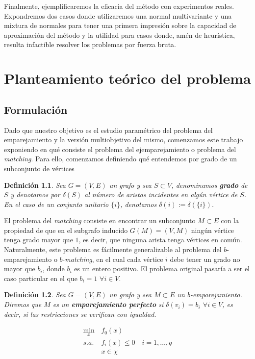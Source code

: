 \documentclass[twoside,a4paper,openright,12pt]{book}
\newtheorem{defi}{Definici\'on}[section]
\begin{document}
Finalmente, ejemplificaremos la eficacia del método con experimentos reales. Expondremos dos casos donde utilizaremos una normal multivariante y una mixtura de normales para tener una primera impresión sobre la capacidad de aproximación del método y la utilidad para casos donde, amén de heurística, resulta infactible resolver los problemas por fuerza bruta.


\newpage
\thispagestyle{empty}
\chapter{Planteamiento teórico del problema}
\section{Formulación}
Dado que nuestro objetivo es el estudio paramétrico del problema del emparejamiento y la versión multiobjetivo del mismo, comenzamos este trabajo exponiendo en qué consiste el problema del ejemparejamiento o problema del \textit{matching}. Para ello, comenzamos definiendo qué entendemos por grado de un subconjunto de vértices
\begin{defi}
Sea $G=(V,E)$ un grafo y sea $S \subset V$, denominamos \textbf{grado} de $S$ y denotamos por $\delta(S)$ al número de aristas incidentes en algún vértice de $S$. En el caso de un conjunto unitario $\{i\}$, denotamos $\delta(i):=\delta(\{i\})$. 
\end{defi}
El problema del \textit{matching} consiste en encontrar un subconjunto $M\subset E$ con la propiedad de que en el subgrafo inducido $G(M)=(V,M)$ ningún vértice tenga grado mayor que $1$, es decir, que ninguna arista tenga vértices en común. Naturalmente, este problema es fácilmente generalizable al problema del $b$-emparejamiento o $b$-\textit{matching}, en el cual cada vértice $i$ debe tener un grado no mayor que $b_i$, donde $b_i$ es un entero positivo. El problema original pasaría a ser el caso particular en el que $b_i = 1$ $\forall i \in V$.

\begin{defi}
Sea $G=(V,E)$ un grafo y sea $M\subset E$ un $b$-emparejamiento. Diremos que $M$ es un \textbf{emparejamiento perfecto} si $\delta(v_i)=b_i$ $\forall i \in V$, es decir, si las restricciones se verifican con igualdad.
\end{defi}
\begin{align}
\min_{x} &f_0(x)  \nonumber\\ 
s.a.\;  &  f_i(x)\leq 0 \quad i=1,\dotsc,q \tag{1} \label{eq:1}\\
& x\in\chi \nonumber
\end{align}
\end{document}
